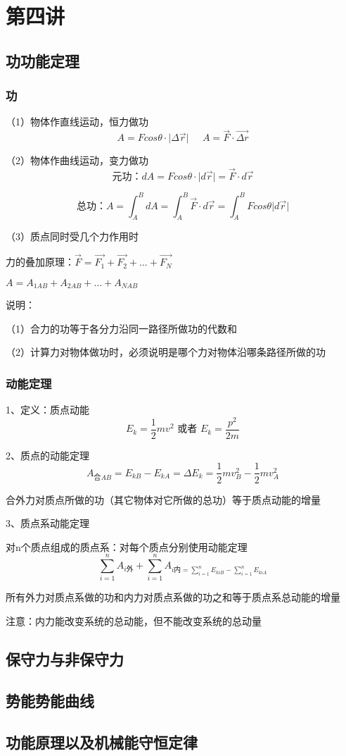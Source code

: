\documentclass[UTF8]{article}
\begin{document}
\section{第四讲\;\;}
\subsection{功\;\;功能定理}
\subsubsection{功}

    （1）物体作直线运动，恒力做功
    \[A = Fcos\theta \cdot \lvert \Delta \vec{r} \vert\;\;\;\;\;A = \vec{F}\cdot\vec{\Delta r}\]

    （2）物体作曲线运动，变力做功
    \[\mbox{元功：}dA = Fcos\theta\cdot\lvert d\vec{r}\vert = \vec{F}\cdot d\vec{r}\]

    \[\mbox{总功：}A = \int_A^BdA = \int_A^B\vec{F}\cdot d\vec{r} = \int_A^BFcos\theta \lvert d\vec{r}\vert\]

    （3）质点同时受几个力作用时

    力的叠加原理：$\vec{F} = \vec{F_1} + \vec{F_2} + \dots + \vec{F_N}$

    \;\;\;\;\;\;\;$A = A_{1AB} + A_{2AB} + \dots + A_{NAB}$

    说明：

    \;\;（1）合力的功等于各分力沿同一路径所做功的代数和

    \;\;（2）计算力对物体做功时，必须说明是哪个力对物体沿哪条路径所做的功

\subsubsection{动能定理}

    1、定义：质点动能\[E_k = \frac{1}{2}mv^2\mbox{ 或者 }E_k = \frac{p^2}{2m}\]

    2、质点的动能定理\[A_{\mbox{合}AB} = E_{kB} - E_{kA} = \Delta E_k = \frac{1}{2}mv_B^2 - \frac{1}{2}mv_A^2\]

    \;\;合外力对质点所做的功（其它物体对它所做的总功）等于质点动能的增量

    3、质点系动能定理

    对n个质点组成的质点系：对每个质点分别使用动能定理
    \[\sum_{i=1}^n A_{i\mbox{外}} + \sum_{i=1}^n A_{i\mbox{内} = \sum_{i=1}^n E_{kiB} - \sum_{i=1}^n E_{kiA}}\]

    所有外力对质点系做的功和内力对质点系做的功之和等于质点系总动能的增量

    注意：内力能改变系统的总动能，但不能改变系统的总动量
\subsection{保守力与非保守力}
\subsection{势能\;\;势能曲线}
\subsection{功能原理以及机械能守恒定律}
\end{document}
